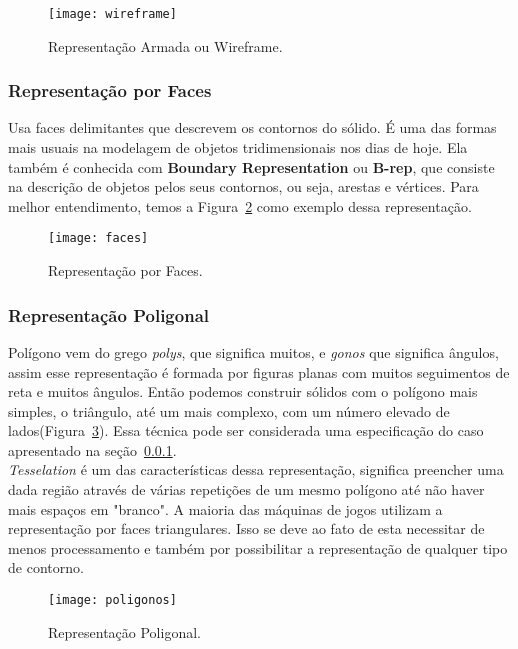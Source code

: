 \begin{figure}[ht!]
	\centering
	\texttt{[image: wireframe]}
	\caption{Representação Armada ou Wireframe.}
	\label{fg:wireframe}
\end{figure} 

\subsubsection{Representação por Faces} 
\label{sec:r_faces}
Usa faces delimitantes que descrevem os contornos do sólido. É uma das formas mais usuais na modelagem de objetos tridimensionais nos dias de hoje. Ela  também é conhecida com  \textbf{Boundary Representation} ou \textbf{B-rep}, que consiste na descrição de  objetos pelos seus contornos, ou seja, arestas e vértices. Para melhor entendimento, temos a Figura~\ref{fg:faces} como exemplo dessa representação.

\begin{figure}[ht!]
      \centering
	  \texttt{[image: faces]}
	  \caption{Representação por Faces.}
	  \label{fg:faces}
\end{figure} 

\subsubsection{Representação Poligonal}
Polígono vem do grego \textit{polys}, que significa muitos, e \textit{gonos} que significa ângulos, assim esse representação é formada por figuras planas com muitos seguimentos de reta e muitos ângulos. Então podemos construir sólidos com o polígono mais simples, o triângulo, até um mais complexo, com um número elevado de lados(Figura~\ref{fg:pilogono}). Essa técnica pode ser considerada uma especificação do caso apresentado na seção~\ref{sec:r_faces}.\\

\textit{Tesselation} é um das características dessa representação, significa preencher uma dada região através de várias repetições de um mesmo polígono até não haver mais espaços em "branco". A maioria das máquinas de jogos utilizam a representação por faces triangulares. Isso se deve ao fato de esta necessitar de menos processamento e também por possibilitar a representação de qualquer tipo de contorno\cite{traina}.

\begin{figure}[ht!]
      \centering
	  \texttt{[image: poligonos]}
	  \caption{Representação Poligonal.}
	  \label{fg:pilogono}
\end{figure} 

